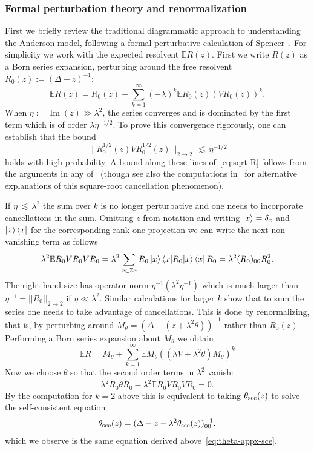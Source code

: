 \documentclass[11pt]{amsart}
\def\Expec{{\mathbb E}}
\newcommand{\Impt}{\operatorname*{Im}}
\def\lsim{{\,\lesssim\,}}
\def\bra#1{\mathinner{\langle{#1}|}}
\def\ket#1{\mathinner{|{#1}\rangle}}
\def\braket#1{\mathinner{\langle{#1}\rangle}}
\numberwithin{equation}{section}
\numberwithin{theorem}{section}
\begin{document}
\subsubsection{Formal perturbation theory and renormalization}
\label{sec:formal-perturbation}
First we briefly review the traditional diagrammatic approach to understanding the Anderson model, following a formal perturbative calculation of Spencer~\cite[Chapter 1, Appendix B]{frohlich2012quantum}.
For simplicity we work with the expected resolvent $\Expec R(z)$.
First we write $R(z)$ as a Born series expansion, perturbing around the free resolvent $R_0(z) := (\Delta - z)^{-1}$:
\[
\mathbb{E}R(z) = R_0(z) + \sum_{k=1}^\infty (-\lambda)^k\mathbb{E} R_0(z) (VR_0(z))^{k}.
\]
When $\eta:= \Impt(z)\gg\lambda^2$, the series converges and is dominated by the first term which is of order $\lambda \eta^{-1/2}$.
To prove this convergence rigorously, one can establish that the bound
\begin{equation}
\label{eq:sqrt-R}
\|R_0^{1/2}(z)VR_0^{1/2}(z)\|_{2\to 2}\lsim \eta^{-1/2}
\end{equation}
holds with high probability.
A bound along these lines of~\eqref{eq:sqrt-R} follows from the arguments in any of~\cite{bourgain2001random, SSW, BDH} (though see also the computations in~\cite{van1954quantum, davies1974markovian, spohn1977derivation, EYkinetic} for alternative explanations of this square-root cancellation phenomenon).

If $\eta \lsim \lambda^2$ the sum over $k$ is no longer perturbative and one needs to incorporate cancellations in the sum. Omitting $z$ from notation and writing $\ket{x} = \delta_x$ and $\ket{x}\bra{x}$ for the corresponding rank-one projection we can write the next non-vanishing term as follows
\[
\lambda^2 \mathbb{E}R_0VR_0VR_0
= \lambda^2 \sum_{x\in \mathbb{Z}^d}R_0\ket{x}\braket{x|R_0|x}\bra{x}R_0= \lambda^2(R_0)_{00}R_0^2.
\]
The right hand size has operator norm $\eta^{-1}(\lambda^2\eta^{-1})$
which is much larger than $\eta^{-1} = ||R_0||_{2\to 2}$ if $\eta\ll\lambda^2$.
Similar calculations for larger $k$ show that to sum the series one needs to take advantage of  cancellations.
This is done by renormalizing, that is, by perturbing around $M_\theta = (\Delta- (z+\lambda^2\theta))^{-1}$ rather than $R_0(z)$.
Performing a Born series expansion about $M_\theta$ we obtain
\begin{equation}
\label{eq:renormalized-born}
\mathbb{E}R = M_\theta + \sum_{k=1}^\infty \Expec M_\theta((\lambda V + \lambda^2 \theta)M_\theta)^k
\end{equation}
Now we choose $\theta$ so that the second order terms in $\lambda^2$ vanish:
\[
\lambda^2\tilde{R}_0\theta \tilde{R}_0
- \lambda^2 \mathbb{E}\tilde{R}_0 V\tilde{R}_0V\tilde{R}_0 = 0.
\]
By the computation for $k=2$ above this is equivalent to taking $\theta_{\rm sce}(z)$ to solve the self-consistent equation
\begin{equation}
\label{eq:theta-sce}
\theta_{\rm sce}(z) = (\Delta-z-\lambda^2\theta_{\rm sce}(z))^{-1}_{00},
\end{equation}
which we observe is the same equation derived above~\eqref{eq:theta-appx-sce}.
\end{document}
